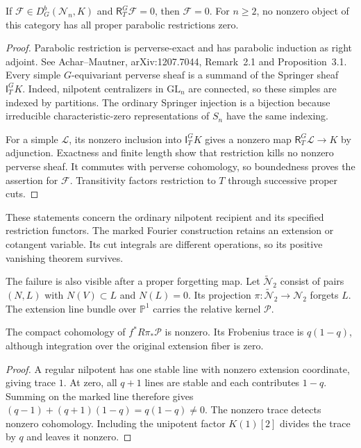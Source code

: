 \begin{proposition}\label{v4-arith:hall:prop:unmarked-detection}
If $\mathcal F\in D^b_G(\mathcal N_n,K)$ and
$\mathsf R_T^G\mathcal F=0$, then $\mathcal F=0$.
For $n\geq2$, no nonzero object of this category has all proper
parabolic restrictions zero.
\end{proposition}
\begin{proof}
Parabolic restriction is perverse-exact and has parabolic induction
as right adjoint. See Achar--Mautner, arXiv:1207.7044,
Remark~2.1 and Proposition~3.1.
Every simple $G$-equivariant perverse sheaf is a summand of the
Springer sheaf $\mathsf I_T^G K$.
Indeed, nilpotent centralizers in $\mathrm{GL}_n$ are connected,
so these simples are indexed by partitions. The ordinary Springer
injection is a bijection because irreducible characteristic-zero
representations of $S_n$ have the same indexing.

For a simple $\mathcal L$, its nonzero inclusion into
$\mathsf I_T^G K$ gives a nonzero map
$\mathsf R_T^G\mathcal L\to K$ by adjunction.
Exactness and finite length show that restriction kills no nonzero
perverse sheaf. It commutes with perverse cohomology, so boundedness
proves the assertion for $\mathcal F$.
Transitivity factors restriction to $T$ through successive proper cuts.
\end{proof}

These statements concern the ordinary nilpotent recipient and its
specified restriction functors. The marked Fourier construction
retains an extension or cotangent variable. Its cut integrals are
different operations, so its positive vanishing theorem survives.

The failure is also visible after a proper forgetting map.
Let $\widetilde{\mathcal N}_2$ consist of pairs $(N,L)$ with
$N(V)\subset L$ and $N(L)=0$. Its projection
$\pi:\widetilde{\mathcal N}_2\to\mathcal N_2$ forgets $L$.
The extension line bundle over $\mathbb P^1$ carries the relative
kernel $\mathcal P$.

\begin{proposition}\label{v4-arith:hall:prop:forget-flag}
The compact cohomology of $f^*R\pi_*\mathcal P$ is nonzero.
Its Frobenius trace is $q(1-q)$, although integration over the
original extension fiber is zero.
\end{proposition}
\begin{proof}
A regular nilpotent has one stable line with nonzero extension
coordinate, giving trace $1$.
At zero, all $q+1$ lines are stable and each contributes $1-q$.
Summing on the marked line therefore gives
$(q-1)+(q+1)(1-q)=q(1-q)\ne0$.
The nonzero trace detects nonzero cohomology.
Including the unipotent factor $K(1)[2]$ divides the trace by $q$
and leaves it nonzero.
\end{proof}

